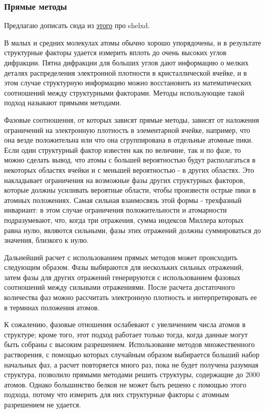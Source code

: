 \documentclass{article}
\begin{document}
\subsubsection{Прямые методы}

Предлагаю дописать сюда из \href{https://sci-hub.do/10.1007/0-387-33746-6}{этого} про shelxd.

В малых и средних молекулах атомы обычно хорошо упорядочены, и в результате структурные факторы удается измерить вплоть до очень высоких углов дифракции. Пятна дифракции для больших углов дают информацию о мелких деталях распределения электронной плотности в кристаллической ячейке, и в этом случае структурную информацию можно восстановить из математических соотношений между структурными факторами. Методы использующие такой подход называют прямыми методами.

Фазовые соотношения, от которых зависят прямые методы, зависят от наложения ограничений на электронную плотность в элементарной ячейке, например, что она везде положительна или что она сгруппирована в отдельные атомные пики. Если один структурный фактор известен как по величине, так и по фазе, то можно сделать вывод, что атомы с большей вероятностью будут располагаться в некоторых областях ячейки и с меньшей вероятностью - в других областях. Это накладывает ограничения на возможные фазы других структурных факторов, которые должны усиливать вероятные области, чтобы произвести острые пики в атомных положениях. Самая сильная взаимосвязь этой формы - трехфазный инвариант: в этом случае ограничения положительности и атомарности подразумевают, что, когда три отражения, сумма индексов Миллера которых равна нулю, являются сильными, фазы этих отражений должны суммироваться до значения, близкого к нулю\cite{ThreePhase}.

Дальнейший расчет с использованием прямых методов может происходить следующим образом. Фазы выбираются для нескольких сильных отражений, затем фазы для других отражений генерируются с использованием фазовых соотношений между сильными отражениями. После расчета достаточного количества фаз можно рассчитать электронную плотность и интерпретировать ее в терминах положения атомов.

К сожалению, фазовые отношения ослабевают с увеличением числа атомов в структуре; кроме того, этот подход работает только тогда, когда данные могут быть собраны с высоким разрешением. Использование методов множественного растворения, с помощью которых случайным образом выбирается больший набор начальных фаз, а расчет повторяется много раз, пока не будет получена разумная структура, позволило прямыми методами решить структуры, содержащие до 2000 атомов. Однако большинство белков не может быть решено с помощью этого подхода, потому что измерить для них структурные факторы с атомным разрешением не удается.
\end{document}
